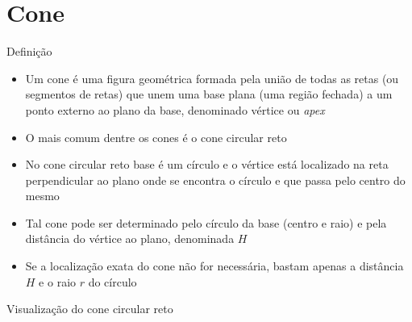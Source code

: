 \section{Cone}

\begin{frame}[fragile]{Definição}

    \begin{itemize}
        \item Um cone é uma figura geométrica formada pela união de todas as retas 
            (ou segmentos de retas) que unem uma base plana (uma região fechada) a um 
            ponto externo ao plano da base, denominado vértice ou \textit{apex}

        \item O mais comum dentre os cones é o cone circular reto

        \item No cone circular reto base é um círculo e o vértice está localizado na reta 
            perpendicular ao plano onde se encontra o círculo e que passa pelo centro do mesmo

        \item Tal cone pode ser determinado pelo círculo da base (centro e raio) e pela distância 
            do vértice ao plano, denominada $H$

        \item Se a localização exata do cone não for necessária, bastam apenas a distância $H$ e o 
            raio $r$ do círculo


    \end{itemize}

\end{frame}

\begin{frame}[fragile]{Visualização do cone circular reto}

    \begin{figure}
        \centering
    \end{figure}

\end{frame}

